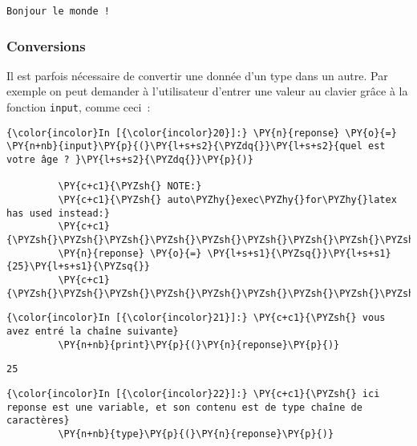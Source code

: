     \begin{Verbatim}[commandchars=\\\{\},frame=single,framerule=0.3mm,rulecolor=\color{cellframecolor}]
Bonjour le monde !
\end{Verbatim}

    \hypertarget{conversions}{%
\subsubsection{Conversions}\label{conversions}}

    Il est parfois nécessaire de convertir une donnée d'un type dans un
autre. Par exemple on peut demander à l'utilisateur d'entrer une valeur
au clavier grâce à la fonction \texttt{input}, comme ceci~:

    \begin{Verbatim}[commandchars=\\\{\},frame=single,framerule=0.3mm,rulecolor=\color{cellframecolor}]
{\color{incolor}In [{\color{incolor}20}]:} \PY{n}{reponse} \PY{o}{=} \PY{n+nb}{input}\PY{p}{(}\PY{l+s+s2}{\PYZdq{}}\PY{l+s+s2}{quel est votre âge ? }\PY{l+s+s2}{\PYZdq{}}\PY{p}{)}
         
         \PY{c+c1}{\PYZsh{} NOTE:}
         \PY{c+c1}{\PYZsh{} auto\PYZhy{}exec\PYZhy{}for\PYZhy{}latex has used instead:}
         \PY{c+c1}{\PYZsh{}\PYZsh{}\PYZsh{}\PYZsh{}\PYZsh{}\PYZsh{}\PYZsh{}\PYZsh{}\PYZsh{}\PYZsh{}}
         \PY{n}{reponse} \PY{o}{=} \PY{l+s+s1}{\PYZsq{}}\PY{l+s+s1}{25}\PY{l+s+s1}{\PYZsq{}}
         \PY{c+c1}{\PYZsh{}\PYZsh{}\PYZsh{}\PYZsh{}\PYZsh{}\PYZsh{}\PYZsh{}\PYZsh{}\PYZsh{}\PYZsh{}}
\end{Verbatim}


    \begin{Verbatim}[commandchars=\\\{\},frame=single,framerule=0.3mm,rulecolor=\color{cellframecolor}]
{\color{incolor}In [{\color{incolor}21}]:} \PY{c+c1}{\PYZsh{} vous avez entré la chaîne suivante}
         \PY{n+nb}{print}\PY{p}{(}\PY{n}{reponse}\PY{p}{)}
\end{Verbatim}


    \begin{Verbatim}[commandchars=\\\{\},frame=single,framerule=0.3mm,rulecolor=\color{cellframecolor}]
25
\end{Verbatim}

    \begin{Verbatim}[commandchars=\\\{\},frame=single,framerule=0.3mm,rulecolor=\color{cellframecolor}]
{\color{incolor}In [{\color{incolor}22}]:} \PY{c+c1}{\PYZsh{} ici reponse est une variable, et son contenu est de type chaîne de caractères}
         \PY{n+nb}{type}\PY{p}{(}\PY{n}{reponse}\PY{p}{)}
\end{Verbatim}


